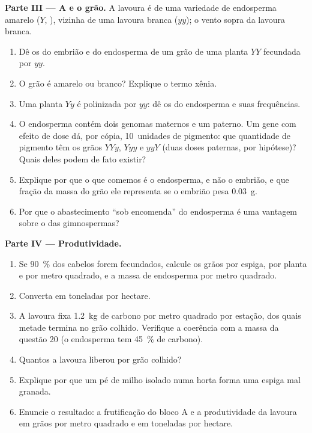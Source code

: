\begin{problem}
\medskip
\noindent\textbf{Parte III --- A  e o grão.}
A lavoura é de uma variedade de endosperma amarelo ($Y$, ),
vizinha de uma lavoura branca ($yy$); o vento sopra da lavoura branca.
\begin{enumerate}[resume]
  \item Dê os  do embrião e do endosperma de um grão de uma
        planta $YY$ fecundada por  $yy$.
  \item O grão é amarelo ou branco? Explique o termo xênia.
  \item Uma planta $Yy$ é polinizada por  $yy$: dê os  do
        endosperma e suas frequências.
  \item O endosperma contém dois genomas maternos e um paterno. Um gene
        com efeito de dose dá, por cópia, 10~unidades de pigmento: que
        quantidade de pigmento têm os grãos $YYy$, $Yyy$ e $yyY$ (duas
        doses paternas, por hipótese)? Quais deles podem de fato
        existir?
  \item Explique por que o que comemos é o endosperma, e não o
        embrião, e que fração da massa do grão ele representa se o
        embrião pesa \qty{0.03}{g}.
  \item Por que o abastecimento ``sob encomenda'' do endosperma é uma
        vantagem sobre o das gimnospermas?
\end{enumerate}

\medskip
\noindent\textbf{Parte IV --- Produtividade.}
\begin{enumerate}[resume]
  \item Se \qty{90}{\%} dos cabelos forem fecundados, calcule os grãos
        por espiga, por planta e por metro quadrado, e a massa de
        endosperma por metro quadrado.
  \item Converta em toneladas por hectare.
  \item A lavoura fixa \qty{1.2}{kg} de carbono por metro quadrado por
        estação, dos quais metade termina no grão colhido. Verifique a
        coerência com a massa da questão 20 (o endosperma tem
        \qty{45}{\%} de carbono).
  \item Quantos  a lavoura liberou por grão colhido?
  \item Explique por que um pé de milho isolado numa horta forma uma
        espiga mal granada.
  \item Enuncie o resultado: a frutificação do bloco A e a
        produtividade da lavoura em grãos por metro quadrado e em
        toneladas por hectare.
\end{enumerate}
\end{problem}
